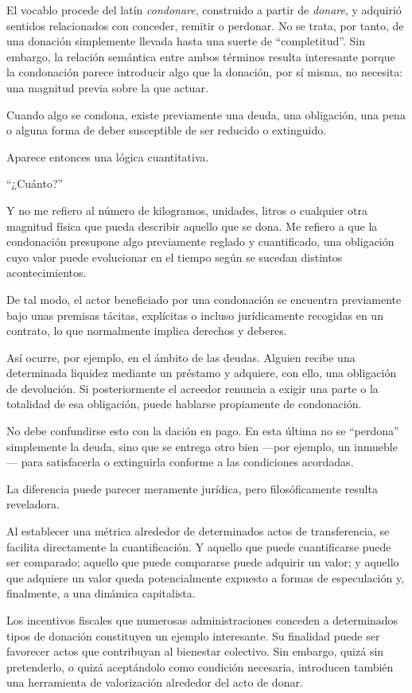 \documentclass[12pt]{article}
\begin{document}
El vocablo procede del latín \emph{condonare}, construido a partir de \emph{donare}, y adquirió sentidos relacionados con conceder, remitir o perdonar. No se trata, por tanto, de una donación simplemente llevada hasta una suerte de ``completitud''. Sin embargo, la relación semántica entre ambos términos resulta interesante porque la condonación parece introducir algo que la donación, por sí misma, no necesita: una magnitud previa sobre la que actuar.

Cuando algo se condona, existe previamente una deuda, una obligación, una pena o alguna forma de deber susceptible de ser reducido o extinguido.

Aparece entonces una lógica cuantitativa.

``¿Cuánto?''

Y no me refiero al número de kilogramos, unidades, litros o cualquier otra magnitud física que pueda describir aquello que se dona. Me refiero a que la condonación presupone algo previamente reglado y cuantificado, una obligación cuyo valor puede evolucionar en el tiempo según se sucedan distintos acontecimientos.

De tal modo, el actor beneficiado por una condonación se encuentra previamente bajo unas premisas tácitas, explícitas o incluso jurídicamente recogidas en un contrato, lo que normalmente implica derechos y deberes.

Así ocurre, por ejemplo, en el ámbito de las deudas. Alguien recibe una determinada liquidez mediante un préstamo y adquiere, con ello, una obligación de devolución. Si posteriormente el acreedor renuncia a exigir una parte o la totalidad de esa obligación, puede hablarse propiamente de condonación.

No debe confundirse esto con la dación en pago. En esta última no se ``perdona'' simplemente la deuda, sino que se entrega otro bien ---por ejemplo, un inmueble--- para satisfacerla o extinguirla conforme a las condiciones acordadas.

La diferencia puede parecer meramente jurídica, pero filosóficamente resulta reveladora.

Al establecer una métrica alrededor de determinados actos de transferencia, se facilita directamente la cuantificación. Y aquello que puede cuantificarse puede ser comparado; aquello que puede compararse puede adquirir un valor; y aquello que adquiere un valor queda potencialmente expuesto a formas de especulación y, finalmente, a una dinámica capitalista.

Los incentivos fiscales que numerosas administraciones conceden a determinados tipos de donación constituyen un ejemplo interesante. Su finalidad puede ser favorecer actos que contribuyan al bienestar colectivo. Sin embargo, quizá sin pretenderlo, o quizá aceptándolo como condición necesaria, introducen también una herramienta de valorización alrededor del acto de donar.
\end{document}
